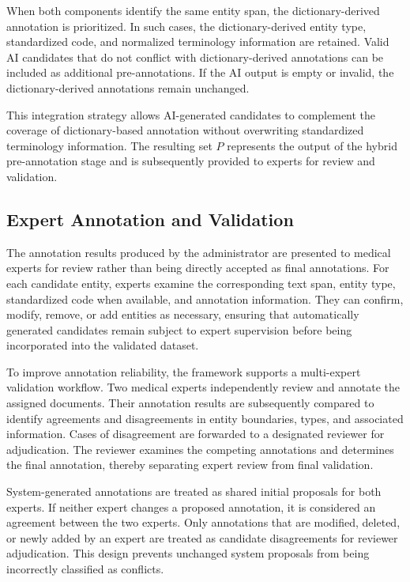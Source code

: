 \documentclass[runningheads]{llncs}
\begin{document}
When both components identify the same entity span, the dictionary-derived annotation is prioritized. In such cases, the dictionary-derived entity type, standardized code, and normalized terminology information are retained. Valid AI candidates that do not conflict with dictionary-derived annotations can be included as additional pre-annotations. If the AI output is empty or invalid, the dictionary-derived annotations remain unchanged.

This integration strategy allows AI-generated candidates to complement the coverage of dictionary-based annotation without overwriting standardized terminology information. The resulting set $P$ represents the output of the hybrid pre-annotation stage and is subsequently provided to experts for review and validation.

\subsection{Expert Annotation and Validation}
The annotation results produced by the administrator are presented to medical experts for review rather than being directly accepted as final annotations. For each candidate entity, experts examine the corresponding text span, entity type, standardized code when available, and annotation information. They can confirm, modify, remove, or add entities as necessary, ensuring that automatically generated candidates remain subject to expert supervision before being incorporated into the validated dataset.

To improve annotation reliability, the framework supports a multi-expert validation workflow. Two medical experts independently review and annotate the assigned documents. Their annotation results are subsequently compared to identify agreements and disagreements in entity boundaries, types, and associated information. Cases of disagreement are forwarded to a designated reviewer for adjudication. The reviewer examines the competing annotations and determines the final annotation, thereby separating expert review from final validation.

System-generated annotations are treated as shared initial proposals for both
experts. If neither expert changes a proposed annotation, it is considered an
agreement between the two experts. Only annotations that are modified,
deleted, or newly added by an expert are treated as candidate disagreements
for reviewer adjudication. This design prevents unchanged system proposals
from being incorrectly classified as conflicts.
\end{document}
